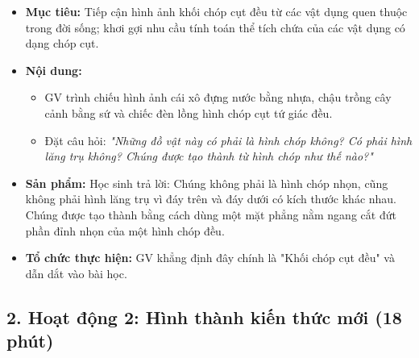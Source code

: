 \documentclass[12pt, a4paper]{article}
\begin{document}
\begin{itemize}[leftmargin=1.2cm]
    \item[a)] \textbf{Mục tiêu:} Tiếp cận hình ảnh khối chóp cụt đều từ các vật dụng quen thuộc trong đời sống; khơi gợi nhu cầu tính toán thể tích chứa của các vật dụng có dạng chóp cụt.
    \item[b)] \textbf{Nội dung:}
    \begin{itemize}[leftmargin=0.6cm]
        \item GV trình chiếu hình ảnh cái xô đựng nước bằng nhựa, chậu trồng cây cảnh bằng sứ và chiếc đèn lồng hình chóp cụt tứ giác đều.
        \item Đặt câu hỏi: \textit{"Những đồ vật này có phải là hình chóp không? Có phải hình lăng trụ không? Chúng được tạo thành từ hình chóp như thế nào?"}
    \end{itemize}

    \item[c)] \textbf{Sản phẩm:} Học sinh trả lời: Chúng không phải là hình chóp nhọn, cũng không phải hình lăng trụ vì đáy trên và đáy dưới có kích thước khác nhau. Chúng được tạo thành bằng cách dùng một mặt phẳng nằm ngang cắt đứt phần đỉnh nhọn của một hình chóp đều.
    \item[d)] \textbf{Tổ chức thực hiện:} GV khẳng định đây chính là "Khối chóp cụt đều" và dẫn dắt vào bài học.
\end{itemize}

\subsection*{2. Hoạt động 2: Hình thành kiến thức mới (18 phút)}
\end{document}
